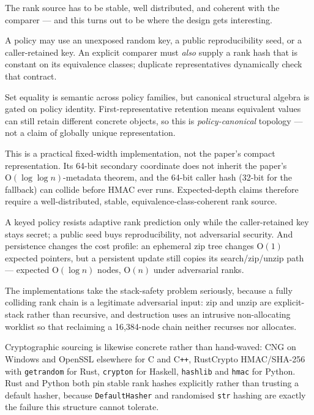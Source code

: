 \documentclass[11pt,twoside,openright]{book}
\newcommand{\code}[1]{\texorpdfstring{\textcolor{d7ink}{\texttt{#1}}}{#1}}
\newcommand{\term}[1]{\textit{#1}}
\newcommand{\bigoh}[1]{$\mathrm{O}(#1)$}
\begin{document}
The rank source has to be stable, well distributed, and coherent with the
comparer --- and this turns out to be where the design gets interesting.

\begin{contractbox}
A policy may use an unexposed random key, a public reproducibility seed, or a
caller-retained key. An explicit comparer must \emph{also} supply a rank hash
that is constant on its equivalence classes; duplicate representatives
dynamically check that contract.

Set equality is semantic across policy families, but canonical structural
algebra is gated on policy identity. First-representative retention means
equivalent values can still retain different concrete objects, so this is
\term{policy-canonical} topology --- not a claim of globally unique
representation.
\end{contractbox}

\begin{caveatbox}
This is a practical fixed-width implementation, not the paper's compact
representation. Its 64-bit secondary coordinate does not inherit the paper's
\bigoh{\log \log n}-metadata theorem, and the 64-bit caller hash (32-bit for the
fallback) can collide before HMAC ever runs. Expected-depth claims therefore
require a well-distributed, stable, equivalence-class-coherent rank source.

A keyed policy resists adaptive rank prediction only while the caller-retained
key stays secret; a public seed buys reproducibility, not adversarial security.
And persistence changes the cost profile: an ephemeral zip tree changes
\bigoh{1} expected pointers, but a persistent update still copies its
search/zip/unzip path --- expected \bigoh{\log n} nodes, \bigoh{n} under
adversarial ranks.
\end{caveatbox}

The implementations take the stack-safety problem seriously, because a fully
colliding rank chain is a legitimate adversarial input: zip and unzip are
explicit-stack rather than recursive, and destruction uses an intrusive
non-allocating worklist so that reclaiming a 16{,}384-node chain neither
recurses nor allocates.

Cryptographic sourcing is likewise concrete rather than hand-waved: CNG on
Windows and OpenSSL elsewhere for C and C\texttt{++}, RustCrypto HMAC/SHA-256
with \code{getrandom} for Rust, \code{crypton} for Haskell, \code{hashlib} and
\code{hmac} for Python. Rust and Python both pin stable rank hashes explicitly
rather than trusting a default hasher, because \code{DefaultHasher} and
randomised \code{str} hashing are exactly the failure this structure cannot
tolerate.
\end{document}
